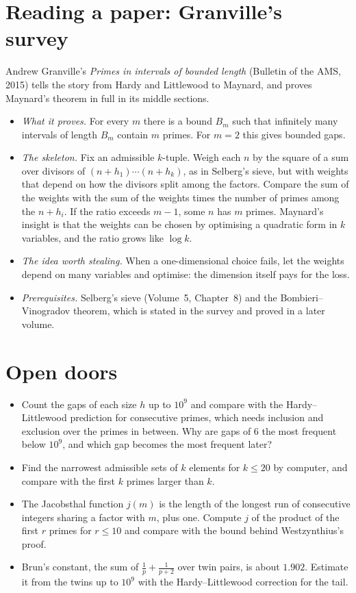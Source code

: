 \section{Reading a paper: Granville's survey}

Andrew Granville's \emph{Primes in intervals of bounded length} (Bulletin of the AMS, 2015) tells the story from Hardy and Littlewood to Maynard, and
proves Maynard's theorem in full in its middle sections.
\begin{itemize}
\item \emph{What it proves.} For every $m$ there is a bound $B_m$ such that infinitely many intervals of length $B_m$ contain $m$ primes. For $m=2$ this
gives bounded gaps.
\item \emph{The skeleton.} Fix an admissible $k$-tuple. Weigh each $n$ by the square of a sum over divisors of $(n+h_1)\cdots(n+h_k)$, as in Selberg's sieve,
but with weights that depend on how the divisors split among the factors. Compare the sum of the weights with the sum of the weights times the number
of primes among the $n+h_i$. If the ratio exceeds $m-1$, some $n$ has $m$ primes. Maynard's insight is that the weights can be chosen by optimising a
quadratic form in $k$ variables, and the ratio grows like $\log k$.
\item \emph{The idea worth stealing.} When a one-dimensional choice fails, let the weights depend on many variables and optimise: the dimension itself
pays for the loss.
\item \emph{Prerequisites.} Selberg's sieve (Volume~5, Chapter~8) and the Bombieri--\allowbreak Vinogradov theorem, which is stated in the survey and proved in a
later volume.
\end{itemize}

\section{Open doors}

\begin{itemize}
\item Count the gaps of each size $h$ up to $10^9$ and compare with the Hardy--Littlewood prediction for consecutive primes, which needs inclusion and
exclusion over the primes in between. Why are gaps of $6$ the most frequent below $10^{9}$, and which gap becomes the most frequent later?
\item Find the narrowest admissible sets of $k$ elements for $k\le20$ by computer, and compare with the first $k$ primes larger than $k$.
\item The Jacobsthal function $j(m)$ is the length of the longest run of consecutive integers sharing a factor with $m$, plus one. Compute $j$ of the
product of the first $r$ primes for $r\le10$ and compare with the bound behind Westzynthius's proof.
\item Brun's constant, the sum of $\frac1p+\frac1{p+2}$ over twin pairs, is about $1.902$. Estimate it from the twins up to $10^9$ with the
Hardy--Littlewood correction for the tail.
\end{itemize}

